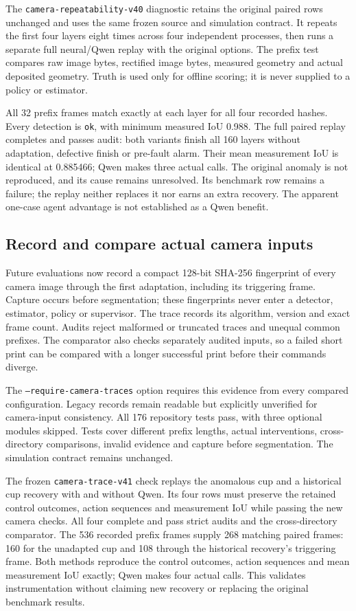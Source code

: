 \documentclass[10pt,letterpaper]{article}
\begin{document}
The \texttt{camera-repeatability-v40} diagnostic retains the original paired
rows unchanged and uses the same frozen source and simulation contract. It
repeats the first four layers eight times across four independent processes,
then runs a separate full neural/Qwen replay with the original options.
The prefix test compares raw image bytes, rectified image bytes, measured
geometry and actual deposited geometry. Truth is used only for offline scoring;
it is never supplied to a policy or estimator.

All 32 prefix frames match exactly at each layer for all four recorded hashes.
Every detection is \texttt{ok}, with minimum measured IoU 0.988. The full paired
replay completes and passes audit: both variants finish all 160 layers without
adaptation, defective finish or pre-fault alarm. Their mean measurement IoU is
identical at 0.885466; Qwen makes three actual calls. The original anomaly is not
reproduced, and its cause remains unresolved. Its benchmark row remains a
failure; the replay neither replaces it nor earns an extra recovery. The apparent
one-case agent advantage is not established as a Qwen benefit.

\subsection*{Record and compare actual camera inputs}
Future evaluations now record a compact 128-bit SHA-256 fingerprint of every
camera image through the first adaptation, including its triggering frame.
Capture occurs before segmentation; these fingerprints never enter a detector,
estimator, policy or supervisor. The trace records its algorithm, version and
exact frame count. Audits reject malformed or truncated traces and unequal
common prefixes. The comparator also checks separately audited inputs, so a
failed short print can be compared with a longer successful print before their
commands diverge.

The \texttt{--require-camera-traces} option requires this evidence from every
compared configuration. Legacy records remain readable but explicitly unverified
for camera-input consistency. All 176 repository tests pass, with three optional
modules skipped. Tests cover different prefix lengths, actual interventions,
cross-directory comparisons, invalid evidence and capture before segmentation.
The simulation contract remains unchanged.

The frozen \texttt{camera-trace-v41} check replays the anomalous cup and a
historical cup recovery with and without Qwen. Its four rows must preserve
the retained control outcomes, action sequences and measurement IoU while
passing the new camera checks. All four complete and pass strict audits and
the cross-directory comparator. The 536 recorded prefix frames supply 268
matching paired frames: 160 for the unadapted cup and 108 through the historical
recovery's triggering frame. Both methods reproduce the control outcomes,
action sequences and mean measurement IoU exactly; Qwen makes four actual calls.
This validates instrumentation without claiming new recovery or replacing the
original benchmark results.
\end{document}
